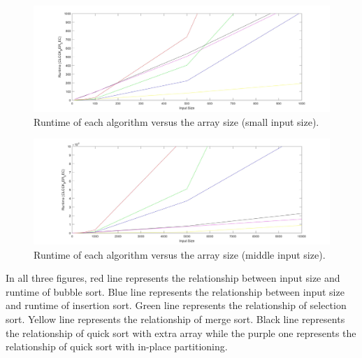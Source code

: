\documentclass{article}
\begin{document}
\begin{figure}[H]
\centering
\includegraphics[width=\textwidth]{2.jpg}
\caption{Runtime of each algorithm versus the array size (small input size).}
\end{figure}
\begin{figure}[H]
\centering
\includegraphics[width=\textwidth]{3.jpg}
\caption{Runtime of each algorithm versus the array size (middle input size).}
\end{figure}
In all three figures, red line represents the relationship between input size and runtime of bubble sort. Blue line represents the relationship between input size and runtime of insertion sort. Green line represents the relationship of selection sort. Yellow line represents the relationship of merge sort. Black line represents the relationship of quick sort with extra array while the purple one represents the relationship of quick sort with in-place partitioning.\\
\end{document}
